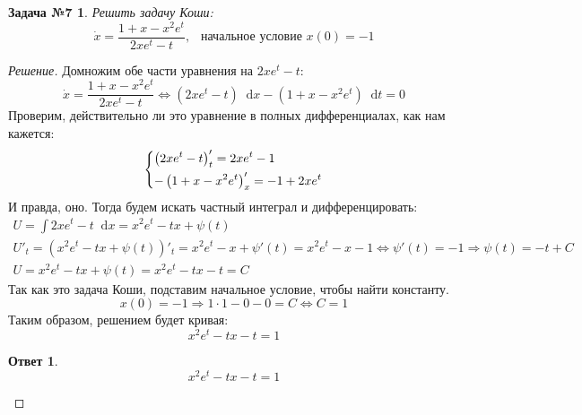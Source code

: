 \documentclass[a4paper,12pt]{article}
\newtheorem*{task7}{Задача №7}
\newtheorem*{ans}{Ответ}
\renewcommand*\d{\mathop{}\!\mathrm{d}}
\newcommand{\dx}{\dot{x}}
\newcommand{\bto}{\Longrightarrow}
\newcommand{\ds}{\displaystyle}
\begin{document}
\begin{task7}
	Решить задачу Коши:
	\[\dx = \dfrac{1 + x - x^2e^t}{2xe^t - t},\ \ \text{ начальное условие } x(0) = -1\]
\end{task7}
\begin{proof}[Решение]
	Домножим обе части уравнения на $2xe^t - t$:
	\[\dx = \dfrac{1 + x - x^2e^t}{2xe^t - t} \iff \left(2xe^t - t\right)\d x - \left(1 + x - x^2e^t\right)\d t = 0\]
	Проверим, действительно ли это уравнение в полных дифференциалах, как нам кажется:
	\[\left\{\begin{gathered}
	\left(2xe^t - t\right)'_t = 2xe^t - 1\hfill\\
	-\left(1 + x - x^2e^t\right)'_x = -1 + 2xe^t\hfill
	\end{gathered}\right.\]
	И правда, оно. Тогда будем искать частный интеграл и дифференцировать:
	\begin{gather*}
	U = \ds\int 2xe^t - t\d x = x^2e^t - tx + \psi(t)\\
	U'_t = \left(x^2e^t - tx + \psi(t)\right)'_t = x^2e^t - x + \psi'(t) = x^2e^t - x - 1 \iff \psi'(t) = -1 \bto \psi(t) = -t + C\\
	U = x^2e^t - tx + \psi(t) = x^2e^t - tx - t = C
	\end{gather*}
	Так как это задача Коши, подставим начальное условие, чтобы найти константу.
	\[x(0) = -1 \bto 1\cdot 1 - 0 - 0 = C \iff C = 1\]
	Таким образом, решением будет кривая:
	\[x^2e^t - tx - t = 1\]
	\begin{ans}
		\[x^2e^t - tx - t = 1\]
	\end{ans}
\end{proof}
\end{document}
